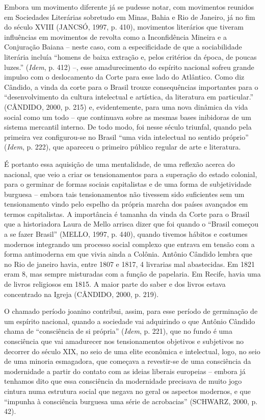 Embora um movimento diferente já se pudesse notar, com movimentos
reunidos em Sociedades Literárias sobretudo em Minas, Bahia e Rio de
Janeiro, já no fim do século XVIII (JANCSÓ, 1997, p. 410), movimentos
literários que tiveram influências em movimentos de revolta como a
Inconfidência Mineira e a Conjuração Baiana -- neste caso, com a
especificidade de que a sociabilidade literária incluía ``homens de
baixa extração e, pelos critérios da época, de poucas luzes.''
(\emph{Idem}, p. 412) --, esse amadurecimento do espírito nacional
sofreu grande impulso com o deslocamento da Corte para esse lado do
Atlântico. Como diz Cândido, a vinda da corte para o Brasil trouxe
consequências importantes para o ``desenvolvimento da cultura
intelectual e artística, da literatura em particular.'' (CÂNDIDO, 2000,
p. 215) e, evidentemente, para uma nova dinâmica da vida social como um
todo -- que continuava sobre as mesmas bases inibidoras de um sistema
mercantil interno. De todo modo, foi nesse século triunfal, quando pela
primeira vez configurou-se no Brasil ``uma vida intelectual no sentido
próprio'' (\emph{Idem}, p. 222), que apareceu o primeiro público regular
de arte e literatura.

É portanto essa aquisição de uma mentalidade, de uma reflexão acerca do
nacional, que veio a criar os tensionamentos para a superação do estado
colonial, para o germinar de formas sociais capitalistas e de uma forma
de subjetividade burguesa -- embora tais tensionamentos não tivessem
sido suficientes sem um tensionamento vindo pelo espelho da própria
marcha dos países avançados em termos capitalistas. A importância é
tamanha da vinda da Corte para o Brasil que a historiadora Laura de
Mello arrisca dizer que foi quando o ``Brasil começou a se fazer
Brasil'' (MELLO, 1997, p. 440), quando tivemos hábitos e costumes
modernos integrando um processo social complexo que entrava em tensão
com a forma antimoderna em que vivia ainda a Colônia. Antônio Cândido
lembra que no Rio de janeiro havia, entre 1807 e 1817, 4 livrarias mal
abastecidas. Em 1821 eram 8, mas sempre misturadas com a função de
papelaria. Em Recife, havia uma de livros religiosos em 1815. A maior
parte do saber e dos livros estava concentrado na Igreja (CÂNDIDO, 2000,
p. 219).

O chamado período joanino contribui, assim, para esse período de
germinação de um espírito nacional, quando a sociedade vai adquirindo o
que Antônio Cândido chama de ``consciência de si própria'' (\emph{Idem},
p. 221), que no fundo é uma consciência que vai amadurecer nos
tensionamentos objetivos e subjetivos no decorrer do século XIX, no seio
de uma elite econômica e intelectual, logo, no seio de uma minoria
esmagadora, que começava a revestir-se de uma consciência da modernidade
a partir do contato com as ideias liberais europeias -- embora já
tenhamos dito que essa consciência da modernidade precisava de muito
jogo cintura numa estrutura social que negava no geral os aspectos
modernos, e que ``impunha à consciência burguesa uma série de
acrobacias'' (SCHWARZ, 2000, p. 42).

